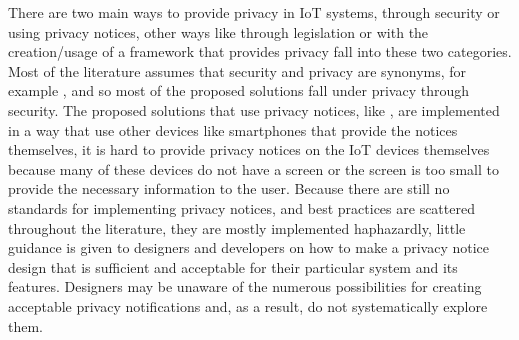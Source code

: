 
There are two main ways to provide privacy in IoT systems, through security
or using privacy notices, other ways like through legislation or with the
creation/usage of a framework that provides privacy fall into these two
categories. Most of the literature assumes that security and privacy are
synonyms, for example \cite{opara2022framework, FabianoInternet, SunSecure},
and so most of the proposed solutions fall under privacy through security.
The proposed solutions that use privacy notices, like \cite{FengDesign},
are implemented in a way that use other devices like smartphones that provide
the notices themselves, it is hard to provide privacy notices on the IoT
devices themselves because many of these devices do not have a screen or
the screen is too small to provide the necessary information to the user.
Because there are still no standards for implementing privacy notices, and
best practices are scattered throughout the literature, they are mostly
implemented haphazardly, little guidance is given to designers and developers
on how to make a privacy notice design that is sufficient and acceptable
for their particular system and its features. Designers may be unaware of
the numerous possibilities for creating acceptable privacy notifications
and, as a result, do not systematically explore them.

